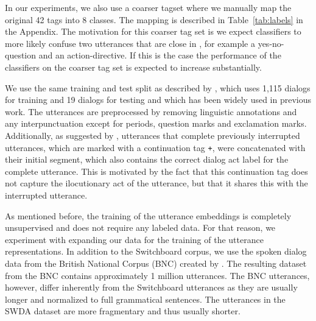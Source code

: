 In our experiments, we also use a coarser tagset where we manually map the original 42 tags into 8 classes. The mapping is described in Table~\ref{tab:labels} in the Appendix. The motivation for this coarser tag set is we expect classifiers to more likely confuse two utterances that are close in , for example a yes-no-question and an action-directive. If this is the case the performance of the classifiers on the coarser tag set is expected to increase substantially.

We use the same training and test split as described by , which uses 1,115 dialogs for training and 19 dialogs for testing and which has been widely used in previous work. 
The utterances are preprocessed by removing linguistic annotations and any interpunctuation except for periods, question marks and exclamation marks.
Additionally, as suggested by , utterances that complete previously interrupted utterances, which are marked with a continuation tag \texttt{+}, were concatenated with their initial segment, which also contains the correct dialog act label for the complete utterance. This is motivated by the fact that this continuation tag does not capture the ilocutionary act of the utterance, but that it shares this with the interrupted utterance.

As mentioned before, the training of the utterance embeddings is completely unsupervised and does not require any labeled data.
For that reason, we experiment with expanding our data for the training of the utterance representations.
In addition to the Switchboard corpus, we use the spoken dialog data from the British National Corpus (BNC) created by .
The resulting dataset from the BNC contains approximately 1 million utterances. 
The BNC utterances, however, differ inherently from the Switchboard utterances as they are usually longer and normalized to full grammatical sentences.
The utterances in the SWDA dataset are more fragmentary and thus usually shorter.



